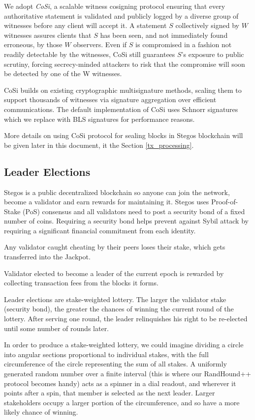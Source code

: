 \documentclass[a4paper, 10pt, conference]{ieeeconf}
\begin{document}
We adopt \textit{CoSi}\cite{c10}\cite{c11}, a scalable witness cosigning protocol ensuring that every authoritative statement is validated and publicly logged by a diverse group of witnesses before any client will accept it. A statement $S$ collectively signed by $W$ witnesses assures clients that $S$ has been seen, and not immediately found erroneous, by those $W$ observers. Even if $S$ is compromised in a fashion not readily detectable by the witnesses, CoSi still guarantees $S$’s exposure to public scrutiny, forcing secrecy-minded attackers to risk that the compromise will soon be detected by one of the W witnesses. 

CoSi builds on existing cryptographic multisignature methods, scaling them to support thousands of witnesses via signature aggregation over efficient communications. The default implementation of CoSi uses Schnorr signatures which we replace with BLS signatures for performance reasons.

More details on using CoSi protocol for sealing blocks in Stegos blockchain will be given later in this document, it the Section \ref{tx_processing}.

\subsection{Leader Elections}

Stegos is a public decentralized blockchain so anyone can join the network, become a validator and earn rewards for maintaining it. Stegos uses Proof-of-Stake (PoS) consensus and all validators need to post a security bond of a fixed number of coins. Requiring a security bond helps prevent against Sybil attack by requiring a significant financial commitment from each identity.

Any validator caught cheating by their peers loses their stake, which gets transferred into the Jackpot. 

Validator elected to become a leader of the current epoch is rewarded by collecting transaction fees from the blocks it forms.

Leader elections are stake-weighted lottery. The larger the validator stake (security bond), the greater the chances of winning the current round of the lottery. After serving one round, the leader relinquishes his right to be re-elected until some number of rounds later.

In order to produce a stake-weighted lottery, we could imagine dividing a circle into angular sections proportional to individual stakes, with the full circumference of the circle representing the sum of all stakes. A uniformly generated random number over a finite interval (this is where our RandHound++ protocol becomes handy) acts as a spinner in a dial readout, and wherever it points after a spin, that member is selected as the next leader. Larger stakeholders occupy a larger portion of the circumference, and so have a more likely chance of winning.
\end{document}
